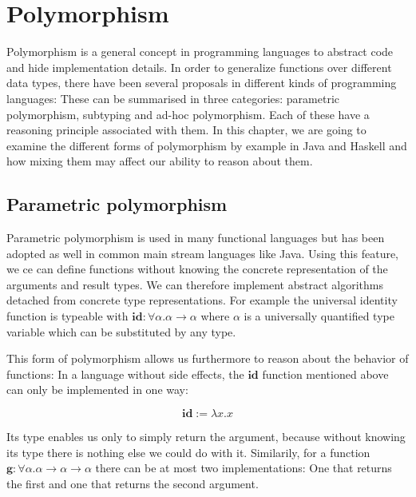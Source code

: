 \chapter{Polymorphism}
\label{ch:polymorphism}

Polymorphism is a general concept in programming languages to abstract code and hide implementation details.
In order to generalize functions over different data types, there have been several proposals in different kinds of programming languages:
These can be summarised in three categories: parametric polymorphism, subtyping and ad-hoc polymorphism.
Each of these have a reasoning principle associated with them.
In this chapter, we are going to examine the different forms of polymorphism by example in Java and Haskell and how mixing them may affect our ability to reason about them.

\section{Parametric polymorphism}\label{sec:parmetric-polymorphism}

Parametric polymorphism is used in many functional languages but has been adopted as well in common main stream languages like Java.
Using this feature, we ce can define functions without knowing the concrete representation of the arguments and result types.
We can therefore implement abstract algorithms detached from concrete type representations.
For example the universal identity function is typeable with $\mathbf{id} : \forall \alpha. \alpha \to \alpha$ where $\alpha$ is a universally quantified type variable which can be substituted by any type.

This form of polymorphism allows us furthermore to reason about the behavior of functions:
In a language without side effects, the $\mathbf{id}$ function mentioned above can only be implemented in one way:

$$
  \mathbf{id} := \lambda x.x
$$

Its type enables us only to simply return the argument, because without knowing its type there is nothing else we could do with it.
Similarily, for a function $\mathbf{g} : \forall \alpha. \alpha \to \alpha \to \alpha$ there can be at most two implementations:
One that returns the first and one that returns the second argument.

